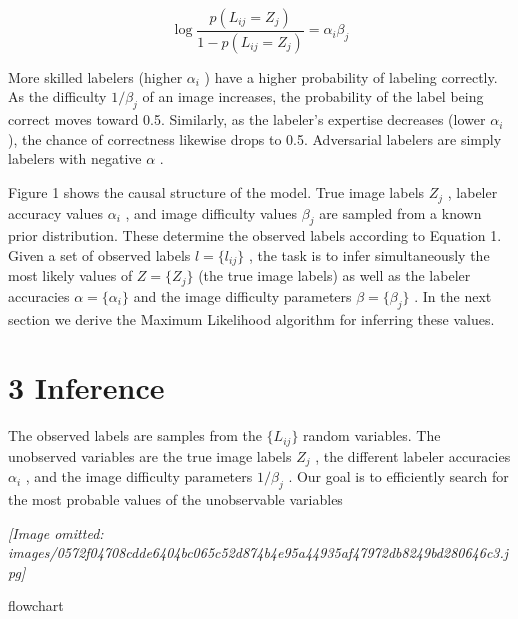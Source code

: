 \documentclass[
]{article}
\begin{document}
\[
\log \frac {p \left(L _ {i j} = Z _ {j}\right)}{1 - p \left(L _ {i j} = Z _ {j}\right)} = \alpha_ {i} \beta_ {j} \tag {2}
\]

More skilled labelers (higher \(\alpha_{i}\) ) have a higher probability
of labeling correctly. As the difficulty \(1/\beta_{j}\) of an image
increases, the probability of the label being correct moves toward 0.5.
Similarly, as the labeler's expertise decreases (lower \(\alpha_{i}\) ),
the chance of correctness likewise drops to 0.5. Adversarial labelers
are simply labelers with negative \(\alpha\) .

Figure 1 shows the causal structure of the model. True image labels
\(Z_{j}\) , labeler accuracy values \(\alpha_{i}\) , and image
difficulty values \(\beta_{j}\) are sampled from a known prior
distribution. These determine the observed labels according to Equation
1. Given a set of observed labels \(l = \{l_{ij}\}\) , the task is to
infer simultaneously the most likely values of \(Z = \{Z_{j}\}\) (the
true image labels) as well as the labeler accuracies
\(\alpha = \{\alpha_{i}\}\) and the image difficulty parameters
\(\beta = \{\beta_{j}\}\) . In the next section we derive the Maximum
Likelihood algorithm for inferring these values.

\section{3 Inference}\label{inference}

The observed labels are samples from the \(\{L_{ij}\}\) random
variables. The unobserved variables are the true image labels \(Z_{j}\)
, the different labeler accuracies \(\alpha_{i}\) , and the image
difficulty parameters \(1/\beta_{j}\) . Our goal is to efficiently
search for the most probable values of the unobservable variables

\textit{[Image omitted: images/0572f04708cdde6404bc065c52d874b4e95a44935af47972db8249bd280646c3.jpg]}

flowchart
\end{document}
